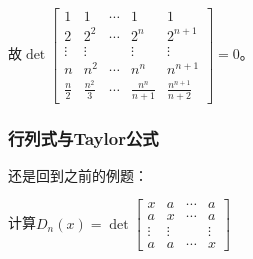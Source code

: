 \begin{solution}
                    故$\det\begin{bmatrix}1&1&\cdots&1&1\\2&2^2&\cdots&2^n&2^{n+1}\\\vdots&\vdots&&\vdots&\vdots\\n&n^2&\cdots&n^n&n^{n+1}\\\frac{n}{2}&\frac{n^2}{3}&\cdots&\frac{n^n}{n+1}&\frac{n^{n+1}}{n+2}\end{bmatrix}=0$。

                \end{solution}

            \subsubsection{行列式与Taylor公式}

                还是回到之前的例题：

                \begin{example}
                    计算$D_n(x)=\det\begin{bmatrix}x&a&\cdots&a\\a&x&\cdots&a\\\vdots&\vdots&&\vdots\\a&a&\cdots&x\end{bmatrix}$
                \end{example}

